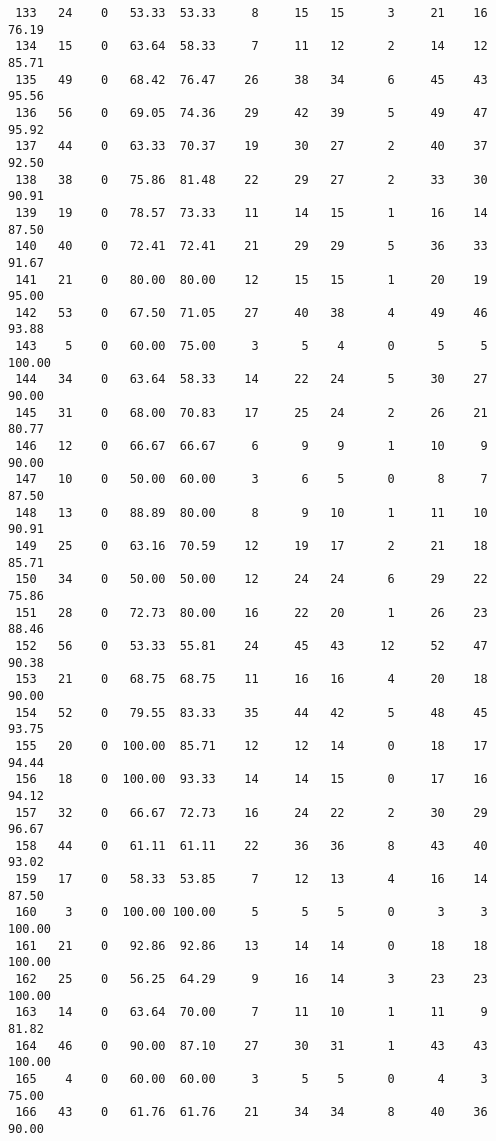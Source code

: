 \begin{verbatim}
 133   24    0   53.33  53.33     8     15   15      3     21    16    76.19
 134   15    0   63.64  58.33     7     11   12      2     14    12    85.71
 135   49    0   68.42  76.47    26     38   34      6     45    43    95.56
 136   56    0   69.05  74.36    29     42   39      5     49    47    95.92
 137   44    0   63.33  70.37    19     30   27      2     40    37    92.50
 138   38    0   75.86  81.48    22     29   27      2     33    30    90.91
 139   19    0   78.57  73.33    11     14   15      1     16    14    87.50
 140   40    0   72.41  72.41    21     29   29      5     36    33    91.67
 141   21    0   80.00  80.00    12     15   15      1     20    19    95.00
 142   53    0   67.50  71.05    27     40   38      4     49    46    93.88
 143    5    0   60.00  75.00     3      5    4      0      5     5   100.00
 144   34    0   63.64  58.33    14     22   24      5     30    27    90.00
 145   31    0   68.00  70.83    17     25   24      2     26    21    80.77
 146   12    0   66.67  66.67     6      9    9      1     10     9    90.00
 147   10    0   50.00  60.00     3      6    5      0      8     7    87.50
 148   13    0   88.89  80.00     8      9   10      1     11    10    90.91
 149   25    0   63.16  70.59    12     19   17      2     21    18    85.71
 150   34    0   50.00  50.00    12     24   24      6     29    22    75.86
 151   28    0   72.73  80.00    16     22   20      1     26    23    88.46
 152   56    0   53.33  55.81    24     45   43     12     52    47    90.38
 153   21    0   68.75  68.75    11     16   16      4     20    18    90.00
 154   52    0   79.55  83.33    35     44   42      5     48    45    93.75
 155   20    0  100.00  85.71    12     12   14      0     18    17    94.44
 156   18    0  100.00  93.33    14     14   15      0     17    16    94.12
 157   32    0   66.67  72.73    16     24   22      2     30    29    96.67
 158   44    0   61.11  61.11    22     36   36      8     43    40    93.02
 159   17    0   58.33  53.85     7     12   13      4     16    14    87.50
 160    3    0  100.00 100.00     5      5    5      0      3     3   100.00
 161   21    0   92.86  92.86    13     14   14      0     18    18   100.00
 162   25    0   56.25  64.29     9     16   14      3     23    23   100.00
 163   14    0   63.64  70.00     7     11   10      1     11     9    81.82
 164   46    0   90.00  87.10    27     30   31      1     43    43   100.00
 165    4    0   60.00  60.00     3      5    5      0      4     3    75.00
 166   43    0   61.76  61.76    21     34   34      8     40    36    90.00

\end{verbatim}

